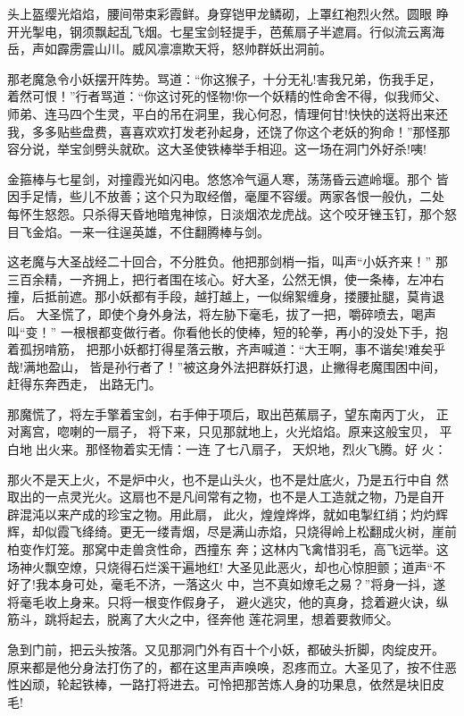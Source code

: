 头上盔缨光焰焰，腰间带束彩霞鲜。身穿铠甲龙鳞砌，上罩红袍烈火然。圆眼
睁开光掣电，钢须飘起乱飞烟。七星宝剑轻提手，芭蕉扇子半遮肩。行似流云离海
岳，声如霹雳震山川。威风凛凛欺天将，怒帅群妖出洞前。

那老魔急令小妖摆开阵势。骂道：“你这猴子，十分无礼!害我兄弟，伤我手足，
着然可恨！”行者骂道：“你这讨死的怪物!你一个妖精的性命舍不得，似我师父、
师弟、连马四个生灵，平白的吊在洞里，我心何忍，情理何甘!快快的送将出来还
我，多多贴些盘费，喜喜欢欢打发老孙起身，还饶了你这个老妖的狗命！”那怪那
容分说，举宝剑劈头就砍。这大圣使铁棒举手相迎。这一场在洞门外好杀!咦!

金箍棒与七星剑，对撞霞光如闪电。悠悠冷气逼人寒，荡荡昏云遮岭堰。那个
皆因手足情，些儿不放善；这个只为取经僧，毫厘不容缓。两家各恨一般仇，二处
每怀生怒怨。只杀得天昏地暗鬼神惊，日淡烟浓龙虎战。这个咬牙锉玉钉，那个怒
目飞金焰。一来一往逞英雄，不住翻腾棒与剑。

这老魔与大圣战经二十回合，不分胜负。他把那剑梢一指，叫声“小妖齐来！”
那三百余精，一齐拥上，把行者围在垓心。好大圣，公然无惧，使一条棒，左冲右
撞，后抵前遮。那小妖都有手段，越打越上，一似绵絮缠身，搂腰扯腿，莫肯退后。
大圣慌了，即使个身外身法，将左胁下毫毛，拔了一把，嚼碎喷去，喝声叫“变！”
一根根都变做行者。你看他长的使棒，短的轮拳，再小的没处下手，抱着孤拐啃筋，
把那小妖都打得星落云散，齐声喊道：“大王啊，事不谐矣!难矣乎哉!满地盈山，
皆是孙行者了！”被这身外法把群妖打退，止撇得老魔围困中间，赶得东奔西走，
出路无门。

那魔慌了，将左手擎着宝剑，右手伸于项后，取出芭蕉扇子，望东南丙丁火，
正对离宫，唿喇的一扇子，将下来，只见那就地上，火光焰焰。原来这般宝贝，
平白地出火来。那怪物着实无情：一连了七八扇子，天炽地，烈火飞腾。好
火：

那火不是天上火，不是炉中火，也不是山头火，也不是灶底火，乃是五行中自
然取出的一点灵光火。这扇也不是凡间常有之物，也不是人工造就之物，乃是自开
辟混沌以来产成的珍宝之物。用此扇，此火，煌煌烨烨，就如电掣红绡；灼灼辉
辉，却似霞飞绛绮。更无一缕青烟，尽是满山赤焰，只烧得岭上松翻成火树，崖前
柏变作灯笼。那窝中走兽贪性命，西撞东
奔；这林内飞禽惜羽毛，高飞远举。这场神火飘空燎，只烧得石烂溪干遍地红!
大圣见此恶火，却也心惊胆颤；道声“不好了!我本身可处，毫毛不济，一落这火
中，岂不真如燎毛之易？”将身一抖，遂将毫毛收上身来。只将一根变作假身子，
避火逃灾，他的真身，捻着避火诀，纵筋斗，跳将起去，脱离了大火之中，径奔他
莲花洞里，想着要救师父。

急到门前，把云头按落。又见那洞门外有百十个小妖，都破头折脚，肉绽皮开。
原来都是他分身法打伤了的，都在这里声声唤唤，忍疼而立。大圣见了，按不住恶
性凶顽，轮起铁棒，一路打将进去。可怜把那苦炼人身的功果息，依然是块旧皮毛!


